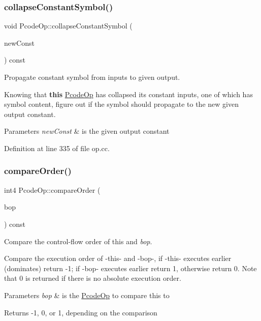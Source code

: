 \subsubsection{\texorpdfstring{collapseConstantSymbol()}{collapseConstantSymbol()}}
{\footnotesize\ttfamily void Pcode\+Op\+::collapse\+Constant\+Symbol (\begin{DoxyParamCaption}\item[{\mbox{\hyperlink{class_varnode}{Varnode}} $\ast$}]{new\+Const }\end{DoxyParamCaption}) const}



Propagate constant symbol from inputs to given output. 

Knowing that {\bfseries{this}} \mbox{\hyperlink{class_pcode_op}{Pcode\+Op}} has collapsed its constant inputs, one of which has symbol content, figure out if the symbol should propagate to the new given output constant. 
\begin{DoxyParams}{Parameters}
{\em new\+Const} & is the given output constant \\
\hline
\end{DoxyParams}


Definition at line 335 of file op.\+cc.

\mbox{\label{class_pcode_op_a9a58052af8c0272d059c44fa4172c18a}} 
\subsubsection{\texorpdfstring{compareOrder()}{compareOrder()}}
{\footnotesize\ttfamily int4 Pcode\+Op\+::compare\+Order (\begin{DoxyParamCaption}\item[{const \mbox{\hyperlink{class_pcode_op}{Pcode\+Op}} $\ast$}]{bop }\end{DoxyParamCaption}) const}



Compare the control-\/flow order of this and {\itshape bop}. 

Compare the execution order of -\/this-\/ and -\/bop-\/, if -\/this-\/ executes earlier (dominates) return -\/1; if -\/bop-\/ executes earlier return 1, otherwise return 0. Note that 0 is returned if there is no absolute execution order. 
\begin{DoxyParams}{Parameters}
{\em bop} & is the \mbox{\hyperlink{class_pcode_op}{Pcode\+Op}} to compare this to \\
\hline
\end{DoxyParams}
\begin{DoxyReturn}{Returns}
-\/1, 0, or 1, depending on the comparison 
\end{DoxyReturn}


